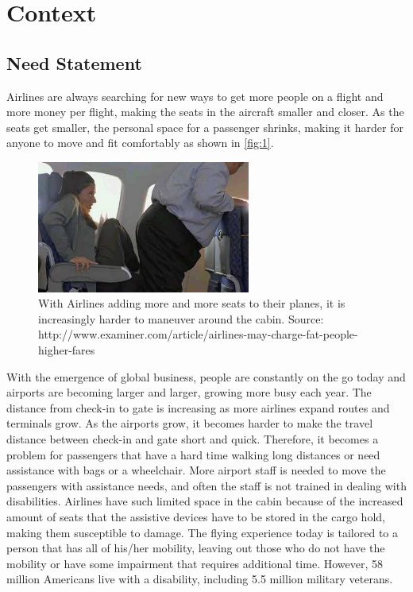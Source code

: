 \chapter{Context}
\label{sec-context} %

\section{Need Statement}
Airlines are always searching for new ways to get more people on a flight and more money per flight, making the seats in the aircraft smaller and closer. As the seats get smaller, the personal space for a passenger shrinks, making it harder for anyone to move and fit comfortably as shown in \ref{fig:1}.

\begin{figure}[h]
  \centering
     \includegraphics[width=7cm]{images/image009.png}
   \caption{With Airlines adding more and more seats to their planes, it is increasingly harder to maneuver around the cabin.
                  Source: http://www.examiner.com/article/airlines-may-charge-fat-people-higher-fares}
  \label{fig:9}
\end{figure}


With the emergence of global business, people are constantly on the go today and airports are becoming larger and larger, growing more busy each year.  The distance from check-in to gate is increasing as more airlines expand routes and terminals grow.  As the airports grow, it becomes harder to make the travel distance between check-in and gate short and quick.  Therefore, it becomes a problem for passengers that have a hard time walking long distances or need assistance with bags or a wheelchair. More airport staff is needed to move the passengers with assistance needs, and often the staff is not trained in dealing with disabilities.  Airlines have such limited space in the cabin because of the increased amount of seats that the assistive devices have to be stored in the cargo hold, making them susceptible to damage.  The flying experience today is tailored to a person that has all of his/her mobility, leaving out those who do not have the mobility or have some impairment that requires additional time. However, 58 million Americans live with a disability, including 5.5 million military veterans. \cite{}

